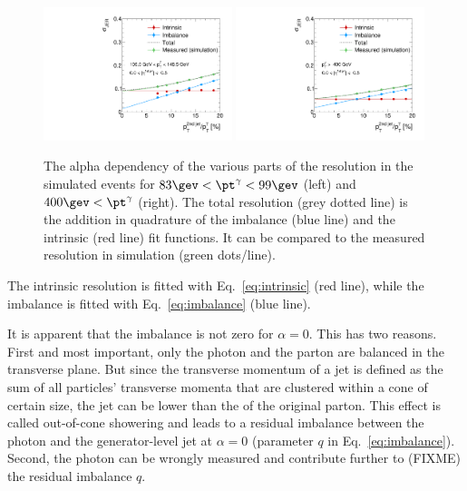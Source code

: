 \begin{figure}[!b]
 \centering
    \includegraphics[width=0.49\textwidth]{figures/resolution/methodology/JER_for_1_eta_bin_5_pTGamma_bin_wo_data_PFCHS_RMS99_mc.pdf} 
    \includegraphics[width=0.49\textwidth]{figures/resolution/methodology/JER_for_1_eta_bin_12_pTGamma_bin_wo_data_PFCHS_RMS99_mc.pdf} 
  \caption{The alpha dependency of the various parts of the resolution in the simulated events for $83 \gev < \pt^{\gamma} < 99 \gev $ (left) and $400 \gev < \pt^{\gamma}$ (right). 
           The total resolution (grey dotted line) is the addition in quadrature of the imbalance (blue line) and the intrinsic (red line) fit functions. 
           It can be compared to the measured resolution in simulation (green dots/line).}  
 \label{fig:AlphaDependenceOfResolutions}
\end{figure}
The intrinsic resolution is fitted with Eq.~\eqref{eq:intrinsic} (red line), while the imbalance is fitted with Eq.~\eqref{eq:imbalance} (blue line).

It is apparent that the imbalance is not zero for $\alpha=0$. 
This has two reasons.
First and most important, only the photon and the parton are balanced in the transverse plane.
But since the transverse momentum of a jet is defined as the sum of all particles' transverse momenta that are clustered within a cone of certain size, the jet \pt can be lower than the \pt of the original parton.
This effect is called out-of-cone showering and leads to a residual imbalance between the photon \pt and the generator-level jet \pt at $\alpha=0$ (parameter $q$ in Eq.~\eqref{eq:imbalance}).
Second, the photon \pt can be wrongly measured and contribute further to (FIXME) the residual imbalance $q$. 

